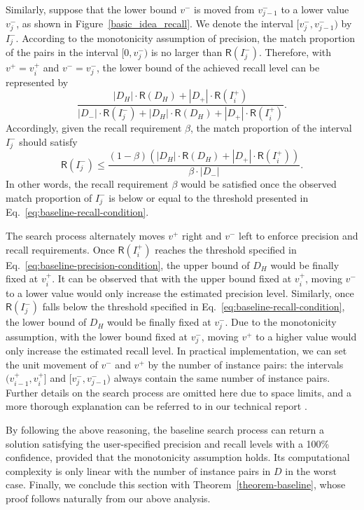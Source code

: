   Similarly, suppose that the lower bound $v^-$ is moved from $v_{j-1}^-$ to a lower value $v_j^-$, as shown in Figure~\ref{basic_idea_recall}. We denote the interval $[v_j^-,v_{j-1}^-)$ by $I_j^-$. According to the monotonicity assumption of precision, the match proportion of the pairs in the interval $[0,v_j^-)$ is no larger than $\mathsf{R}(I_j^-)$. Therefore, with $v^+=v_i^+$ and $v^-=v_j^-$, the lower bound of the achieved recall level can be represented by
\begin{equation} \frac{|D_H|\cdot\mathsf{R}(D_H)+|D_+|\cdot\mathsf{R}(I_i^+)}{|D_-|\cdot\mathsf{R}(I_j^-)+|D_H|\cdot\mathsf{R}(D_H)+|D_+|\cdot\mathsf{R}(I_i^+)}.
\end{equation}
Accordingly, given the recall requirement $\beta$, the match proportion of the interval $I_j^-$ should satisfy
\begin{equation}
  \mathsf{R}(I_j^-)\leq\frac{(1-\beta)(|D_H|\cdot\mathsf{R}(D_H)+|D_+|\cdot\mathsf{R}(I_i^+))}{\beta\cdot |D_-|}.
\label{eq:baseline-recall-condition}
\end{equation}
In other words, the recall requirement $\beta$ would be satisfied once the observed match proportion of $I_j^-$ is below or equal to the threshold presented in Eq.~\ref{eq:baseline-recall-condition}.

	The search process alternately moves $v^+$ right and $v^-$ left to enforce precision and recall requirements. Once $\mathsf{R}(I_i^+)$ reaches the threshold specified in Eq.~\ref{eq:baseline-precision-condition}, the upper bound of $D_H$ would be finally fixed at $v_i^+$. It can be observed that with the upper bound fixed at $v_i^+$, moving $v^-$ to a lower value would only increase the estimated precision level. Similarly, once $\mathsf{R}(I_j^-)$ falls below the threshold specified in Eq.~\ref{eq:baseline-recall-condition}, the lower bound of $D_H$ would be finally fixed at $v_j^-$. Due to the monotonicity assumption, with the lower bound fixed at $v_j^-$, moving $v^+$ to a higher value would only increase the estimated recall level. In practical implementation, we can set the unit movement of $v^-$ and $v^+$ by the number of instance pairs: the intervals $(v_{i-1}^+,v_i^+]$ and $[v_j^-,v_{j-1}^-)$ always contain the same number of instance pairs. Further details on the search process are omitted here due to space limits, and a more thorough explanation can be referred to in our technical report \cite{chen2017humoreport}.

   By following the above reasoning, the baseline search process can return a solution satisfying the user-specified precision and recall levels with a 100\% confidence, provided that the monotonicity assumption holds. Its computational complexity is only linear with the number of instance pairs in $D$ in the worst case. Finally, we conclude this section with Theorem~\ref{theorem-baseline}, whose proof follows naturally from our above analysis.


